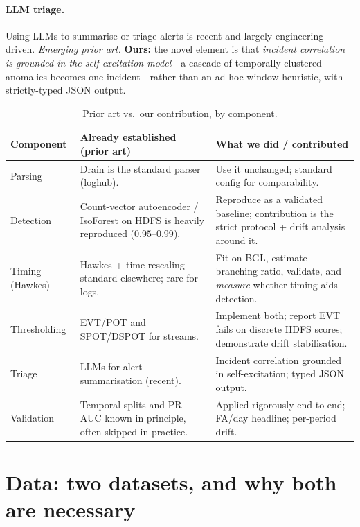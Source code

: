 \documentclass[11pt,a4paper]{article}
\newcommand{\ours}[1]{{\color{good}\textbf{#1}}}
\begin{document}
\paragraph{LLM triage.} Using LLMs to summarise or triage alerts is recent and
largely engineering-driven. \emph{Emerging prior art.} \ours{Ours:} the novel
element is that \emph{incident correlation is grounded in the self-excitation
model}---a cascade of temporally clustered anomalies becomes one incident---rather
than an ad-hoc window heuristic, with strictly-typed JSON output.

\begin{table}[H]
\centering
\caption{Prior art vs.\ our contribution, by component.}
\label{tab:priorwork}
\small
\renewcommand{\arraystretch}{1.15}
\begin{tabular}{@{}p{2.4cm} p{5.7cm} p{5.9cm}@{}}
\toprule
\textbf{Component} & \textbf{Already established (prior art)} & \textbf{\color{good}What we did / contributed} \\
\midrule
Parsing & Drain is the standard parser (loghub). & Use it unchanged; standard config for comparability. \\
Detection & Count-vector autoencoder / IsoForest on HDFS is heavily reproduced ($0.95$--$0.99$). & Reproduce as a validated baseline; contribution is the strict protocol + drift analysis around it. \\
Timing (Hawkes) & Hawkes + time-rescaling standard elsewhere; rare for logs. & Fit on BGL, estimate branching ratio, validate, and \emph{measure} whether timing aids detection. \\
Thresholding & EVT/POT and SPOT/DSPOT for streams. & Implement both; report EVT fails on discrete HDFS scores; demonstrate drift stabilisation. \\
Triage & LLMs for alert summarisation (recent). & Incident correlation grounded in self-excitation; typed JSON output. \\
Validation & Temporal splits and PR-AUC known in principle, often skipped in practice. & Applied rigorously end-to-end; FA/day headline; per-period drift. \\
\bottomrule
\end{tabular}
\end{table}

\section{Data: two datasets, and why both are necessary}
\label{sec:data}
\end{document}
